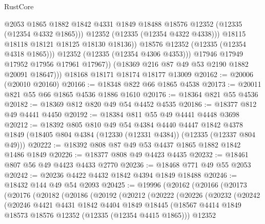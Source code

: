 \begin{lexlean}{RustCore}
\begin{coremodule}
                        @2053
                        @1865
                        @1882
                        @1842
                        @4331
                        @1849
                        @18488
                        @18576
                        @12352
                        (@12335 (@12354 @4332 @1865)))
                      @12352
                      (@12335 (@12354 @4322 @4338)))
                    @18115
                    @18118
                    @18121
                    @18125
                    @18130
                    @18136))
                @18576
                @12352
                (@12335 (@12354 @4318 @1865)))
              @12352
              (@12335 (@12354 @4306 @4353)))
            @17946
            @17949
            @17952
            @17956
            @17961
            @17967))
        (@18369 @216 @87 @49 @53 @2190 @1882 @20091 @18647)))
    @18168
    @18171
    @18174
    @18177
    @13009
@20162 := @20006 (@20010 @20160)
@20166 := @18348 @822 @66 @1865 @4538
@20173 := @20011 @821 @55 @66 @1865 @4536 @1886 @1610
@20176 := @18364 @821 @55 @4536
@20182 := @18369 @812 @820 @49 @54 @4452 @4535
@20186 := @18377 @812 @49 @4441 @4450
@20192 := @18384 @811 @55 @49 @4441 @4448 @3698
@20212 := @18392
    @805
    @810
    @49
    @54
    @4384
    @4440
    @4447
    @1842
    @4378
    @1849
    (@18405 @804 @4384 (@12330 (@12331 @4384)) (@12335 (@12337 @804 @49)))
@20222 := @18392 @808 @87 @49 @53 @4437 @1865 @1882 @1842 @1486 @1849
@20226 := @18377 @808 @49 @4423 @4435
@20232 := @18461 @807 @56 @49 @4423 @4433 @2770
@20236 := @18468 @771 @49 @55 @2053
@20242 := @20236 @4422 @4432 @1842 @4394 @1849 @18488
@20246 := @18432 @144 @49 @54 @2093
@20425 := @19996
    (@20162
      (@20166
        (@20173
          (@20176
            (@20182
              (@20186
                (@20192
                  (@20212
                    (@20222
                      (@20226
                        (@20232
                          (@20242
                            (@20246
                              @4421
                              @4431
                              @1842
                              @4404
                              @1849
                              @18445
                              (@18567
                                @4414
                                @1849
                                @18573
                                @18576
                                @12352
                                (@12335 (@12354 @4415 @1865)))
                              @12352

\end{coremodule}
\end{lexlean}
